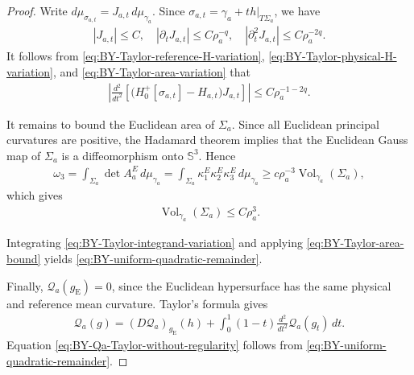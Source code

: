\documentclass[10pt,a4paper]{amsart}
\newcommand{\gE}{g_{\mathrm{E}}}
\newcommand{\Vol}{\operatorname{Vol}}
\begin{document}
\begin{proof}
		
		
		Write $d\mu_{\sigma_{a,t}}=
		J_{a,t}\,d\mu_{\gamma_a}$. Since $\sigma_{a,t}=\gamma_a+t h|_{T\Sigma_a}$, we have
		\begin{align}\label{eq:BY-Taylor-area-variation}
			|J_{a,t}|
			\leq
			C,
			\quad
			|\partial_tJ_{a,t}|
			\leq
			C\rho_a^{-q},
			\quad
			|\partial_t^2J_{a,t}|
			\leq
			C\rho_a^{-2q}.
		\end{align}
		It follows from
		\eqref{eq:BY-Taylor-reference-H-variation},
		\eqref{eq:BY-Taylor-physical-H-variation}, and
		\eqref{eq:BY-Taylor-area-variation} that
		\begin{align}\label{eq:BY-Taylor-integrand-variation}
			\left|
			\frac{d^2}{dt^2}
			\left[
			\bigl(H_0^+[\sigma_{a,t}]-H_{a,t}\bigr)J_{a,t}
			\right]
			\right|
			\leq
			C\rho_a^{-1-2q}.
		\end{align}
		
		It remains to bound the Euclidean area of $\Sigma_a$. Since all Euclidean
		principal curvatures are positive, the Hadamard theorem implies that the
		Euclidean Gauss map of $\Sigma_a$ is a diffeomorphism onto $\mathbb S^3$.
		Hence
		\begin{align*}
			\omega_3
			=\int_{\Sigma_a}
			\det A_a^E\,d\mu_{\gamma_a}
			=\int_{\Sigma_a}
			\kappa_1^E\kappa_2^E\kappa_3^E\,d\mu_{\gamma_a}
			\geq c\rho_a^{-3} \Vol_{\gamma_a}(\Sigma_a),
		\end{align*}
		which gives
		\begin{align}\label{eq:BY-Taylor-area-bound}
			\Vol_{\gamma_a}(\Sigma_a)
			\leq
			C\rho_a^3.
		\end{align}
		
		Integrating \eqref{eq:BY-Taylor-integrand-variation} and applying \eqref{eq:BY-Taylor-area-bound} yields \eqref{eq:BY-uniform-quadratic-remainder}.
		
		Finally, $\mathcal Q_a(\gE)=0$, since the Euclidean hypersurface has the
		same physical and reference mean curvature. Taylor's formula gives
		\begin{align*}
			\mathcal Q_a(g)
			=
			(D\mathcal Q_a)_{\gE}(h)
			+
			\int_0^1
			(1-t)
			\frac{d^2}{dt^2}\mathcal Q_a(g_t)\,dt.
		\end{align*}
		Equation \eqref{eq:BY-Qa-Taylor-without-regularity} follows from
		\eqref{eq:BY-uniform-quadratic-remainder}.
	\end{proof}
	
\end{document}
